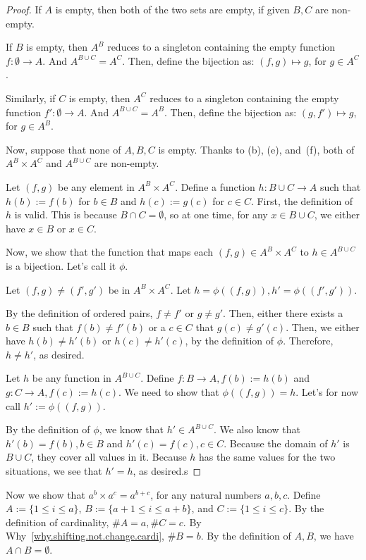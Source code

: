 \begin{proof}
	If $A$ is empty, then both of the two sets are empty, if given $B,C$ are non-empty.
	
	If $B$ is empty, then $A^B$ reduces to a singleton containing the empty function $f: \emptyset \to A$. And $A^{B \cup C} = A^C$. Then, define the bijection as: $(f,g) \mapsto g$, for $g \in A^C$.
	
	Similarly, if $C$ is empty, then $A^C$ reduces to a singleton containing the empty function $f': \emptyset \to A$. And $A^{B \cup C} = A^B$. Then, define the bijection as: $(g,f') \mapsto g$, for $g \in A^B$.
	
	Now, suppose that none of $A,B,C$ is empty. Thanks to  (b), (e), and~(f), both of $A^B \times A^C$ and $A^{B \cup C}$ are non-empty.	
	
	Let $(f,g)$ be any element in $A^B \times A^C$. Define a function $h: B \cup C \to A$ such that $h(b) := f(b)$ for $b \in B$ and $h(c) := g(c)$ for $c \in C$. First, the definition of $h$ is valid. This is because $B \cap C = \emptyset$, so at one time, for any $x \in B \cup C$, we either have $x \in B$ or $x \in C$.
	
	Now, we show that the function that maps each $(f,g) \in A^B \times A^C$ to $h \in A^{B \cup C}$ is a bijection. Let's call it $\phi$.
	
	 Let $(f,g) \ne (f',g')$ be in $A^B \times A^C$. Let $h = \phi((f,g)), h' = \phi((f',g'))$. 
	
	By the definition of ordered pairs, $f \ne f'$ or $g \ne g'$. Then, either there exists a $b \in B$ such that $f(b) \ne f'(b)$ or a $c \in C$ that $g(c) \ne g'(c)$. Then, we either have $h(b) \ne h'(b)$ or $h(c) \ne h'(c)$, by the definition of $\phi$. Therefore, $h \ne h'$, as desired.
	
	 Let $h$ be any function in $A^{B \cup C}$. Define $f: B \to A, f(b) := h(b)$ and $g: C \to A, f(c) := h(c)$. We need to show that $\phi((f,g)) = h$. Let's for now call $h' := \phi((f,g))$.
	
	By the definition of $\phi$, we know that $h' \in A^{B \cup C}$. We also know that $h'(b) = f(b), b \in B$ and $h'(c) = f(c), c \in C$. Because the domain of $h'$ is $B \cup C$, they cover all values in it. Because $h$ has the same values for the two situations, we see that $h' = h$, as desired.s
\end{proof}

Now we show that $a^b \times a^c = a^{b+c}$, for any natural numbers $a,b,c$. Define $A := \{1 \le i \le a\}$, $B := \{a+1 \le i \le a+b\}$, and $C := \{1 \le i \le c\}$. By the definition of cardinality, $\#A = a, \#C = c$. By Why~\ref{why.shifting.not.change.cardi}, $\#B = b$. By the definition of $A,B$, we have $A \cap B = \emptyset$.

